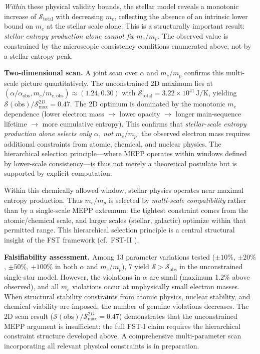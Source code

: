 \documentclass[12pt,a4paper]{article}
\theoremstyle{remark}
\begin{document}
\emph{Within} these physical validity bounds, the stellar model reveals a monotonic increase of $\mathcal{S}_{\text{total}}$ with decreasing $m_e$, reflecting the absence of an intrinsic lower bound on $m_e$ at the stellar scale alone. This is a structurally important result: \emph{stellar entropy production alone cannot fix $m_e/m_p$}. The observed value is constrained by the microscopic consistency conditions enumerated above, not by a stellar entropy peak.

\textbf{Two-dimensional scan.} A joint scan over $\alpha$ and $m_e/m_p$ confirms this multi-scale picture quantitatively. The unconstrained 2D maximum lies at $(\alpha/\alpha_{\text{obs}}, m_e/m_{e,\text{obs}}) \approx (1.24, 0.30)$ with $\mathcal{S}_{\text{total}} = 3.22 \times 10^{41}\,\text{J/K}$, yielding $\mathcal{S}(\text{obs})/\mathcal{S}_{\text{max}}^{2D} = 0.47$. The 2D optimum is dominated by the monotonic $m_e$ dependence (lower electron mass $\to$ lower opacity $\to$ longer main-sequence lifetime $\to$ more cumulative entropy). This confirms that \emph{stellar-scale entropy production alone selects only $\alpha$, not $m_e/m_p$}: the observed electron mass requires additional constraints from atomic, chemical, and nuclear physics. The hierarchical selection principle---where MEPP operates within windows defined by lower-scale consistency---is thus not merely a theoretical postulate but is supported by explicit computation.

Within this chemically allowed window, stellar physics operates near maximal entropy production. Thus $m_e/m_p$ is selected by \emph{multi-scale compatibility} rather than by a single-scale MEPP extremum: the tightest constraint comes from the atomic/chemical scale, and larger scales (stellar, galactic) optimize within that permitted range. This hierarchical selection principle is a central structural insight of the FST framework (cf.\ FST-II \citep{FSTII}).

\textbf{Falsifiability assessment.} Among 13 parameter variations tested ($\pm 10\%$, $\pm 20\%$, $\pm 50\%$, $+100\%$ in both $\alpha$ and $m_e/m_p$), 7 yield $\mathcal{S} > \mathcal{S}_{\text{obs}}$ in the unconstrained single-star model. However, the violations in $\alpha$ are small (maximum 1.2\% above observed), and all $m_e$ violations occur at unphysically small electron masses. When structural stability constraints from atomic physics, nuclear stability, and chemical viability are imposed, the number of genuine violations decreases. The 2D scan result ($\mathcal{S}(\text{obs})/\mathcal{S}_{\text{max}}^{2D} = 0.47$) demonstrates that the unconstrained MEPP argument is insufficient: the full FST-I claim requires the hierarchical constraint structure developed above. A comprehensive multi-parameter scan incorporating all relevant physical constraints is in preparation.
\end{document}
